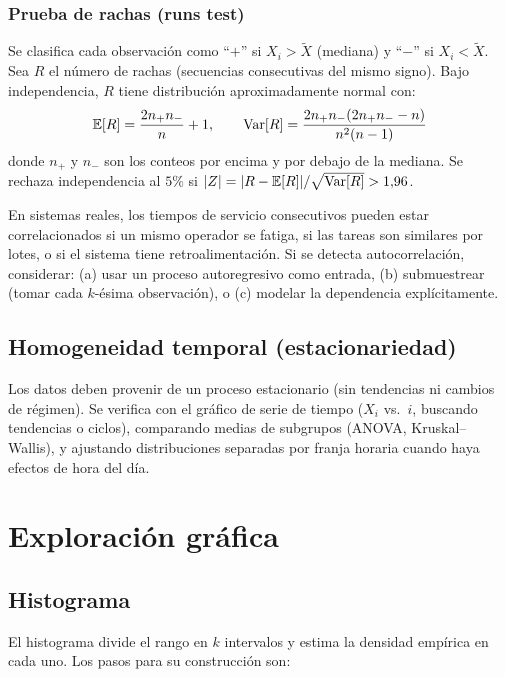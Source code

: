 \documentclass[11pt, letterpaper]{article}
\begin{document}
\subsubsection{Prueba de rachas (runs test)}

Se clasifica cada observación como ``$+$'' si $X_i > \tilde X$ (mediana) y ``$-$'' si $X_i < \tilde X$. Sea $R$ el número de rachas (secuencias consecutivas del mismo signo). Bajo independencia, $R$ tiene distribución aproximadamente normal con:
\[
\mathbb{E}[R] = \frac{2n_+ n_-}{n} + 1, \qquad \operatorname{Var}[R] = \frac{2n_+n_-(2n_+n_- - n)}{n^2(n-1)}
\]
donde $n_+$ y $n_-$ son los conteos por encima y por debajo de la mediana. Se rechaza independencia al $5\%$ si $|Z|=|R-\mathbb{E}[R]|/\sqrt{\operatorname{Var}[R]} > 1{,}96$.

\begin{alertabox}
En sistemas reales, los tiempos de servicio consecutivos pueden estar correlacionados si un mismo operador se fatiga, si las tareas son similares por lotes, o si el sistema tiene retroalimentación. Si se detecta autocorrelación, considerar: (a) usar un proceso autoregresivo como entrada, (b) submuestrear (tomar cada $k$-ésima observación), o (c) modelar la dependencia explícitamente.
\end{alertabox}

\subsection{Homogeneidad temporal (estacionariedad)}

Los datos deben provenir de un proceso estacionario (sin tendencias ni cambios de régimen). Se verifica con el gráfico de serie de tiempo ($X_i$ vs.\ $i$, buscando tendencias o ciclos), comparando medias de subgrupos (ANOVA, Kruskal--Wallis), y ajustando distribuciones separadas por franja horaria cuando haya efectos de hora del día.

\section{Exploración gráfica}

\subsection{Histograma}

El histograma divide el rango en $k$ intervalos y estima la densidad empírica en cada uno. Los pasos para su construcción son:
\end{document}
